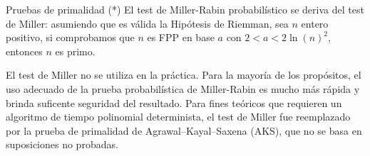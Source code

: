 \begin{section}{Pruebas de primalidad (*)}
El test de Miller-Rabin probabilístico se deriva del test de Miller: asumiendo que es válida la Hipótesis de Riemman, sea $n$ entero positivo,  si comprobamos que $n$ es FPP en base $a$ con $2 < a < 2\ln(n)^2$,  entonces $n$  es primo.  

El test de Miller no se utiliza en la práctica. Para la mayoría de los propósitos, el uso adecuado de la prueba probabilística de Miller-Rabin es mucho más rápida y brinda suficente seguridad del resultado. Para fines teóricos que requieren un algoritmo de tiempo polinomial determinista, el test de Miller fue reemplazado por la prueba de primalidad de  Agrawal–Kayal–Saxena  (AKS), que no se basa en suposiciones no probadas.


\end{section}